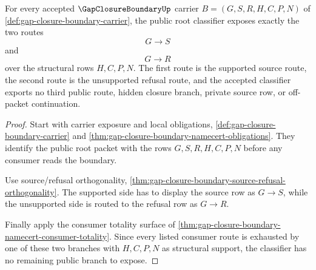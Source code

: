 \begin{theorem}
\label{thm:gap-closure-boundary-finite-source-refusal-classifier}
For every accepted $\GapClosureBoundaryUp$ carrier $B=(G,S,R,H,C,P,N)$ of \autoref{def:gap-closure-boundary-carrier}, the public root classifier exposes exactly the two routes
$$
G \longrightarrow S
$$
and
$$
G \longrightarrow R
$$
over the structural rows $H,C,P,N$. The first route is the supported source route, the second route is the unsupported refusal route, and the accepted classifier exports no third public route, hidden closure branch, private source row, or off-packet continuation.
\end{theorem}
\begin{proof}
Start with carrier exposure and local obligations, \autoref{def:gap-closure-boundary-carrier} and \autoref{thm:gap-closure-boundary-namecert-obligations}. They identify the public root packet with the rows $G,S,R,H,C,P,N$ before any consumer reads the boundary.

Use source/refusal orthogonality, \autoref{thm:gap-closure-boundary-source-refusal-orthogonality}. The supported side has to display the source row as $G \longrightarrow S$, while the unsupported side is routed to the refusal row as $G \longrightarrow R$.

Finally apply the consumer totality surface of \autoref{thm:gap-closure-boundary-namecert-consumer-totality}. Since every listed consumer route is exhausted by one of these two branches with $H,C,P,N$ as structural support, the classifier has no remaining public branch to expose.
\end{proof}

